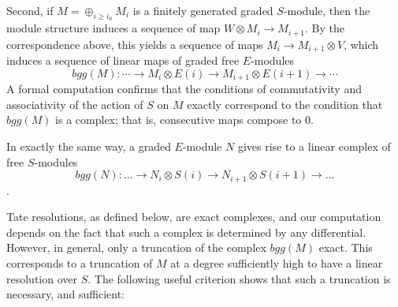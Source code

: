 \documentclass[twoside,12pt, leqno]{amsart}
\def\daniel#1{{\bf *** Daniel:} #1 {\bf ***}}
\begin{document}
Second, if $M = \oplus_{i\geq i_0} M_i$ is a finitely generated graded $S$-module, then the module structure induces a sequence of map $W\otimes M_i \to M_{i+1}$.  By the correspondence above, this yields a sequence of maps $M_i\to M_{i+1}\otimes V$, which induces a sequence of
linear maps of graded free $E$-modules 
$$ 
bgg(M): \cdots \to M_i\otimes E(i) \to M_{i+1}\otimes E(i+1) \to \cdots
$$
A formal computation confirms that the conditions of commutativity and associativity of the action of $S$ on $M$ exactly correspond to the condition that $bgg(M)$ is a complex; that is, consecutive maps compose to 0.

In exactly the same way, a graded $E$-module $N$ gives rise to a linear  complex of free $S$-modules
$$bgg(N): \ldots \to N_i \otimes S(i) \to N_{i+1} \otimes  S(i+1) \to \ldots $$.

Tate resolutions, as defined below, are exact complexes, and our computation depends on the fact that such a complex is
determined by any differential. However, in general, only a truncation of the complex $bgg(M)$ exact. This corresponds to a truncation of $M$ at a degree sufficiently high to have a linear resolution over $S$. The following useful criterion shows that such a truncation is necessary, and sufficient:
\end{document}
